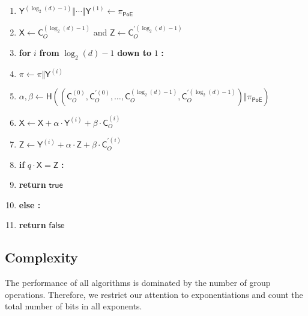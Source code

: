 \documentclass[11pt]{article}
\theoremstyle{Definition}
\begin{document}
\begin{mdframed}
\begin{enumerate}[nolistsep]
	\item $\mathsf{Y}^{(\log_2(d)-1)} \Vert \cdots \Vert \mathsf{Y}^{(1)} \gets \pi_{\mathsf{PoE}}$
	\item $\mathsf{X} \gets \mathsf{C}_O^{(\log_2(d)-1)}$ and $\mathsf{Z} \gets \mathsf{C}_O^{\prime(\log_2(d)-1)}$
	\item \textbf{for} $i$ \textbf{from} $\log_2(d) - 1$ \textbf{down to} $1$ \textbf{:}
	\item \pcind $\pi \gets \pi \Vert \mathsf{Y}^{(i)}$
	\item \pcind $\alpha, \beta \gets \mathsf{H}((\mathsf{C}_O^{(0)}, \mathsf{C}_O^{\prime(0)}, \ldots, \mathsf{C}_O^{(\log_2(d)-1)}, \mathsf{C}_O^{\prime(\log_2(d)-1)}) \Vert \pi_{\mathsf{PoE}})$ 
	\item \pcind $\mathsf{X} \gets \mathsf{X} + \alpha \cdot \mathsf{Y}^{(i)} + \beta \cdot \mathsf{C}_O^{(i)}$
	\item \pcind $\mathsf{Z} \gets \mathsf{Y}^{(i)} + \alpha \cdot \mathsf{Z} + \beta \cdot \mathsf{C}_O^{\prime(i)}$
	\item \textbf{if} $q \cdot \mathsf{X} = \mathsf{Z}$ \textbf{:}
	\item \pcind \textbf{return} $\mathsf{true}$
	\item \textbf{else :}
	\item \pcind \textbf{return} $\mathsf{false}$
\end{enumerate}
\end{mdframed}

\subsection{Complexity}

The performance of all algorithms is dominated by the number of group operations. Therefore, we restrict our attention to exponentiations and count the total number of bits in all exponents.
\end{document}
